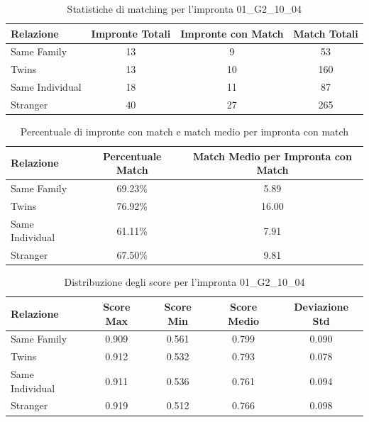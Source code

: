 \begin{table}[htbp]
\centering
\caption{Statistiche di matching per l'impronta 01\_G2\_10\_04}
\label{tab:results_01_G2_10_04}
\begin{tabular}{|l|c|c|c|}
\hline
\textbf{Relazione} & \textbf{Impronte Totali} & \textbf{Impronte con Match} & \textbf{Match Totali} \\
\hline
Same Family & 13 & 9 & 53 \\
\hline
Twins & 13 & 10 & 160 \\
\hline
Same Individual & 18 & 11 & 87 \\
\hline
Stranger & 40 & 27 & 265 \\
\hline
\end{tabular}
\end{table}


\begin{table}[htbp]
\centering
\caption{Percentuale di impronte con match e match medio per impronta con match}
\label{tab:match_percentage_01_G2_10_04}
\begin{tabular}{|l|c|c|}
\hline
\textbf{Relazione} & \textbf{Percentuale Match} & \textbf{Match Medio per Impronta con Match} \\
\hline
Same Family & 69.23\% & 5.89 \\
\hline
Twins & 76.92\% & 16.00 \\
\hline
Same Individual & 61.11\% & 7.91 \\
\hline
Stranger & 67.50\% & 9.81 \\
\hline
\end{tabular}
\end{table}


\begin{table}[htbp]
\centering
\caption{Distribuzione degli score per l'impronta 01\_G2\_10\_04}
\label{tab:scores_01_G2_10_04}
\begin{tabular}{|l|c|c|c|c|}
\hline
\textbf{Relazione} & \textbf{Score Max} & \textbf{Score Min} & \textbf{Score Medio} & \textbf{Deviazione Std} \\
\hline
Same Family & 0.909 & 0.561 & 0.799 & 0.090 \\
\hline
Twins & 0.912 & 0.532 & 0.793 & 0.078 \\
\hline
Same Individual & 0.911 & 0.536 & 0.761 & 0.094 \\
\hline
Stranger & 0.919 & 0.512 & 0.766 & 0.098 \\
\hline
\end{tabular}
\end{table}

